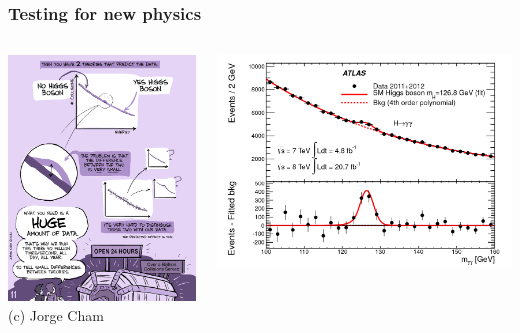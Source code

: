 \documentclass{beamer}
\begin{document}
\begin{frame}
    \frametitle{Testing for new physics}
    \vspace{0.5em}
    \begin{columns}
        \begin{column}{0.55\textwidth}
            \centering
            \includegraphics[width=\textwidth]{figures/phd3.png}\\
            {\scriptsize (c) Jorge Cham}
        \end{column}
        \begin{column}{0.4\textwidth}
            \centering
            \includegraphics[width=\textwidth]{figures/plot-higgs.png}


\end{column}
\end{columns}
\end{frame}
\end{document}
